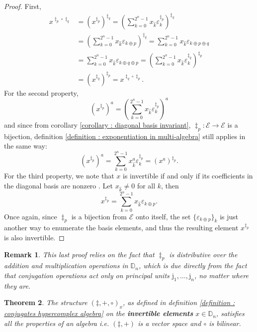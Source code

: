 \documentclass{article}
\newtheorem{theorem}{Theorem}
\newtheorem{remark}[theorem]{Remark}
\begin{document}
\begin{proof}
    First,
    $$ \begin{aligned}
        x^{\ddagger_p \circ \ddagger_q} &= (x^{\ddagger_p})^{\ddagger_q} = \left( \sum_{k=0}^{2^n-1} x_{\hat k} \varepsilon_k^{\ddagger_p} \right)^{\ddagger_q}\\
        &= \left( \sum_{k=0}^{2^n-1} x_{\hat k} \varepsilon_{k \oplus p} \right)^{\ddagger_q} = \sum_{k=0}^{2^n-1} x_{\hat k} \varepsilon_{k \oplus p \oplus q}\\
        &= \sum_{k=0}^{2^n-1} x_{\hat k} \varepsilon_{k \oplus q \oplus p} = \left( \sum_{k=0}^{2^n-1} x_{\hat k} \varepsilon_k^{\ddagger_q} \right)^{\ddagger_p}\\
        &= (x^{\ddagger_q})^{\ddagger_p} = x^{\ddagger_q \circ \ddagger_p}.
    \end{aligned} $$
    For the second property,
    $$ (x^{\ddagger_p})^a = \left(\sum_{k=0}^{2^n-1} x_{\hat k} \varepsilon_{k}^{\ddagger_p} \right)^{a} $$
    and since from corollary \ref{corollary : diagonal basis invariant}, $\ddagger_p : \mathcal{E} \rightarrow \mathcal{E}$ is a bijection, definition \ref{definition : exponentiation in multi-algebra} still applies in the same way:
    $$ (x^{\ddagger_p})^a = \sum_{k=0}^{2^n-1} x_{\hat k}^a \varepsilon_{k}^{\ddagger_p} = (x^a)^{\ddagger_p}. $$
    For the third property, we note that $x$ is invertible if and only if its coefficients in the diagonal basis are nonzero \cite{courchesneAndTremblay2025}. Let $x_{\hat k} \neq 0$ for all $k$, then
    $$ x^{\ddagger_p} = \sum_{k=0}^{2^n-1} x_{\hat k} \varepsilon_{k \oplus p}. $$
    Once again, since $\ddagger_p$ is a bijection from $\mathcal{E}$ onto itself, the set $\{ \varepsilon_{k \oplus p} \}_k$ is just another way to enumerate the basis elements, and thus the resulting element $x^{\ddagger_p}$ is also invertible.
\end{proof}
\begin{remark}
    This last proof relies on the fact that $\ddagger_p$ is distributive over the addition and multiplication operations in $\mathbb{D}_n$, which is due directly from the fact that conjugation operations act only on principal units $\mathrm{j}_1, \ldots, \mathrm{j}_n$, no matter where they are.
\end{remark}
\begin{theorem}
    The structure $(\ddagger, +, \circ)_x$, as defined in definition \ref{definition : conjugates hypercomplex algebra} on the \textbf{invertible elements} $x \in \mathbb{D}_n$, satisfies all the properties of an algebra i.e. $(\ddagger, +)$ is a vector space and $\circ$ is bilinear.
\end{theorem}
\end{document}
